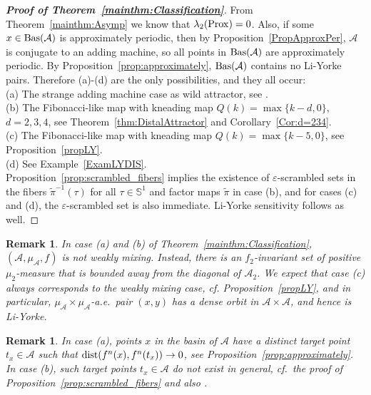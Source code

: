 \documentclass[12pt, psamsfonts, reqno]{amsart}
\newtheorem{remark}[theorem]{Remark}
\begin{document}
\begin{proof}[\textbf{Proof of Theorem~\ref{mainthm:Classification}}]
From Theorem~\ref{mainthm:Asymp} we know that $\lambda_2({\mathop{\rm Prox}\nolimits}) = 0$.
Also, if some $x \in {\mathop{\rm Bas}\nolimits}({{\mathcal A}})$ is approximately periodic, then by
Proposition~\ref{PropApproxPer}, ${{\mathcal A}}$ is conjugate to an adding
machine, so all points in ${\mathop{\rm Bas}\nolimits}({{\mathcal A}})$ are approximately periodic.
By Proposition~\ref{prop:approximately}, ${\mathop{\rm Bas}\nolimits}({{\mathcal A}})$ contains no Li-Yorke
pairs.
Therefore (a)-(d) are the only possibilities, and they all occur:\\
(a) The strange adding machine case as wild attractor, see \cite{Btree}.\\
(b) The Fibonacci-like map with kneading map $Q(k) = \max\{ k-d, 0
\}$, $d = 2,3,4$,
see Theorem~\ref{thm:DistalAttractor} and Corollary~\ref{Cor:d=234}.\\
(c) The Fibonacci-like map with kneading map $Q(k) = \max\{ k-5, 0
\}$, see Proposition~\ref{propLY}.\\
(d) See Example~\ref{ExamLYDIS}.\\
Proposition~\ref{prop:scrambled_fibers} implies the existence of ${\varepsilon}$-scrambled sets in
the fibers $\tilde \pi^{-1}(\tau)$ for all $\tau \in {{\mathbb S}}^1$ and factor maps $\tilde \pi$ in case
(b), and for cases (c) and (d), the ${\varepsilon}$-scrambled set is also immediate.
Li-Yorke sensitivity follows as well.
\end{proof}

\begin{remark} In case (a) and (b) of
Theorem~\ref{mainthm:Classification}, $({{\mathcal A}},\mu_{{\mathcal A}}, f)$ is not weakly
mixing. Instead, there is an $f_2$-invariant set of positive
$\mu_2$-measure that is bounded away from the diagonal of ${{\mathcal A}}_2$.
We expect that case (c) always corresponds to the weakly mixing
case, cf. Proposition~\ref{propLY}, and in particular,
$\mu_{{\mathcal A}} \times \mu_{{\mathcal A}}$-a.e.\ pair $(x,y)$ has a dense orbit in ${{\mathcal A}} \times {{\mathcal A}}$,
and hence is Li-Yorke.
\end{remark}

\begin{remark}
In case (a), points $x$ in the basin of ${{\mathcal A}}$ have a distinct
{\em target} point $t_x \in {{\mathcal A}}$ such that ${\mathop{\rm dist}\nolimits}(f^n(x), f^n(t_x)) \to 0$,
see Proposition~\ref{prop:approximately}.
 In case (b), such target points $t_x \in {{\mathcal A}}$ do not exist in general,
cf.\ the proof of Proposition~\ref{prop:scrambled_fibers} and
also \cite[Remark 2]{BrHaw}.
\end{remark}
\end{document}
